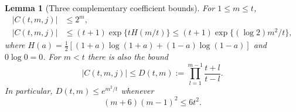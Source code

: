 \documentclass[11pt,a4paper]{article}
\newtheorem{lemma}[theorem]{Lemma}
\theoremstyle{definition}
\theoremstyle{remark}
\numberwithin{equation}{section}
\begin{document}
\begin{lemma}[Three complementary coefficient bounds]
\label{p8:cba:threebounds}
For $1\le m\le t$,
\begin{align}
 |C(t,m,j)|&\le 2^m,\label{p8:cba:degreebound}\\
 |C(t,m,j)|&\le (t+1)\exp\{tH(m/t)\}
       \le(t+1)\exp\{(\log2)m^2/t\},\label{p8:cba:contourbound}
\end{align}
where $H(a)=\frac12[(1+a)\log(1+a)+(1-a)\log(1-a)]$ and $0\log0=0$.
For $m<t$ there is also the bound
\begin{equation}\label{p8:cba:dettebound}
 |C(t,m,j)|\le D(t,m):=
          \prod_{l=1}^{m-1}\frac{t+l}{t-l}.
\end{equation}
In particular, $D(t,m)\le e^{m^2/t}$ whenever
\begin{equation}\label{p8:cba:integercriterion}
 (m+6)(m-1)^2\le6t^2.
\end{equation}
\end{lemma}
\end{document}
